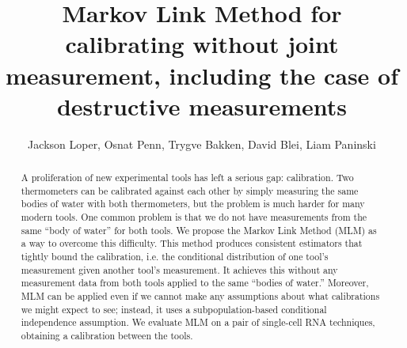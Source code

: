 



\DeclareMathOperator*{\tr}{tr}

\newcommand{\UN}[1]{\ensuremath{\left|#1\right|_\infty}}
\newcommand{\TV}[1]{\ensuremath{\left\Vert #1\right\Vert_{TV}}}
\newcommand{\EN}[1]{\ensuremath{\left|#1\right|}}
\newcommand{\kldiv}[2]{\ensuremath{D\left(#1||#2\right)}}

\newcommand{\figgygr}[2]{\texttt{[image: \#2]}}
\newcommand{\figgy}[1]{\begin{figure}\fbox{\begin{minipage}{\textwidth}#1\end{minipage}}\end{figure}}

\usepackage{cancel}


\title{Markov Link Method for calibrating without joint measurement, including the case of destructive measurements}
\author{Jackson Loper, Osnat Penn, Trygve Bakken, David Blei, Liam Paninski}

\usepackage{amsthm}
\newtheorem{thm}{Theorem}
\newtheorem{lem}{Lemma}
\newtheorem{conj}{Conjecture}

\theoremstyle{definition}
\newtheorem{example}{Example}
\newtheorem{definition}{Definition}


\maketitle

\begin{abstract}
A proliferation of new experimental tools has left a serious gap: calibration. Two thermometers can be calibrated against each other by simply measuring the same bodies of water with both thermometers, but the problem is much harder for many modern tools.  One common problem is that we do not have measurements from the same ``body of water'' for both tools.  We propose the Markov Link Method (MLM) as a way to overcome this difficulty.   This method produces consistent estimators that tightly bound the calibration, i.e. the conditional distribution of one tool's measurement given another tool's measurement. It achieves this without any measurement data from both tools applied to the same ``bodies of water.'' Moreover, MLM can be applied even if we cannot make any assumptions about what calibrations we might expect to see; instead, it uses a subpopulation-based conditional independence assumption.   We evaluate MLM on a pair of single-cell RNA techniques, obtaining a calibration between the tools.
\end{abstract}

